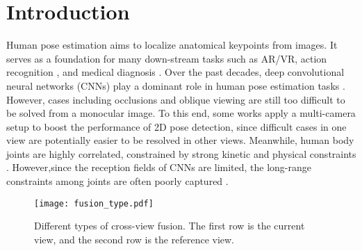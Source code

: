 \documentclass[runningheads]{llncs}
\begin{document}
\section{Introduction}

Human pose estimation aims to localize anatomical keypoints from images. It serves as a foundation for many down-stream tasks such as AR/VR, action recognition \cite{huang2017deep,yan2018spatial}, and medical diagnosis \cite{chen2021pd}. 
Over the past decades, deep convolutional neural networks (CNNs) play a dominant role in human pose estimation tasks \cite{toshev2014deeppose,wei2016convolutional,newell2016stacked,xiao2018simple,sun2019deep,bestofboth,wang2020predicting}. 
However, cases including occlusions and oblique viewing are still too difficult to be solved from a monocular image. To this end, some works apply a multi-camera setup \cite{simon2017hand,wang2019geometric,h36m_pami,chen2021mvhm} to boost the performance of 2D pose detection\cite{qiu2019cross,he2020epipolar}, since difficult cases in one view are potentially easier to be resolved in other views. 
Meanwhile, human body joints are highly correlated, constrained by strong kinetic and physical constraints \cite{tompson2014joint}. 
However,since the reception fields of CNNs are limited,
the long-range constraints among joints are often poorly captured \cite{li2021tokenpose}.  


\begin{figure}[!t]
    \centering
    \texttt{[image: fusion\_type.pdf]}
    \caption{\small{Different types of cross-view fusion. The first row is the current view, and the second row is the reference view. }  }
    \label{fig:cross_fusion_type}
\end{figure}
\end{document}
